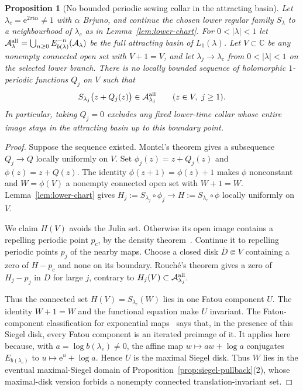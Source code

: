 \documentclass[11pt,a4paper]{article}
\newtheorem{proposition}[theorem]{Proposition}
\theoremstyle{definition}
\newcommand{\eee}{\mathrm{e}}
\newcommand{\ii}{\mathrm{i}}
\begin{document}
\begin{proposition}[No bounded periodic sewing collar in the attracting basin]
\label{prop:no-basin-collar}
Let $\lambda_c=\eee^{2\pi\ii\alpha}\ne1$ with $\alpha$ Brjuno, and
continue the chosen lower regular family $S_\lambda$ to a
neighbourhood of $\lambda_c$ as in Lemma~\ref{lem:lower-chart}.
For $0<|\lambda|<1$ let
$\mathcal A_\lambda^{\rm all}
 =\bigcup_{n\ge0}E_{b(\lambda)}^{-n}(\mathcal A_\lambda)$
be the full attracting basin of $L_1(\lambda)$.
Let $V\subset\mathbb C$ be any nonempty connected open set with
$V+1=V$, and let $\lambda_j\to\lambda_c$ from $0<|\lambda|<1$
on the selected lower branch.  There is no locally bounded sequence
of holomorphic $1$-periodic functions $Q_j$ on $V$ such that
\[
 S_{\lambda_j}\bigl(z+Q_j(z)\bigr)
       \in\mathcal A_{\lambda_j}^{\rm all}
 \qquad(z\in V,\ j\ge1).
\]
In particular, taking $Q_j=0$ excludes any fixed lower-time collar
whose entire image stays in the attracting basin up to this boundary
point.
\end{proposition}

\begin{proof}
Suppose the sequence existed.  Montel's theorem gives a subsequence
$Q_j\to Q$ locally uniformly on $V$.  Set
$\phi_j(z)=z+Q_j(z)$ and $\phi(z)=z+Q(z)$.
The identity $\phi(z+1)=\phi(z)+1$ makes $\phi$ nonconstant and
$W=\phi(V)$ a nonempty connected open set with $W+1=W$.
Lemma~\ref{lem:lower-chart} gives
$H_j:=S_{\lambda_j}\circ\phi_j\to
 H:=S_{\lambda_c}\circ\phi$ locally uniformly on $V$.

We claim $H(V)$ avoids the Julia set.  Otherwise its open image
contains a repelling periodic point $p_c$, by the density
theorem~\cite[Thm.~4]{Bergweiler1993}.  Continue it to repelling periodic
points $p_j$ of the nearby maps.  Choose a closed disk
$\overline D\Subset V$ containing a zero of $H-p_c$ and none on its
boundary.  Rouch\'e's theorem gives a zero of $H_j-p_j$ in $D$ for
large $j$, contrary to
$H_j(V)\subset\mathcal A_{\lambda_j}^{\rm all}$.

Thus the connected set $H(V)=S_{\lambda_c}(W)$ lies in one Fatou
component $U$.  The identity $W+1=W$ and the functional equation
make $U$ invariant.  The Fatou-component classification for
exponential maps~\cite[\S1, Remarks on notation]{Rempe2006Topological}
says that, in the presence of this Siegel disk, every Fatou component
is an iterated preimage of it.  It applies here because, with
$a=\log b(\lambda_c)\ne0$, the affine map
$w\mapsto aw+\log a$ conjugates $E_{b(\lambda_c)}$ to
$u\mapsto\eee^u+\log a$.  Hence $U$ is the maximal Siegel disk.
Thus $W$ lies in the eventual maximal-Siegel domain of
Proposition~\ref{prop:siegel-pullback}(2), whose maximal-disk version
forbids a nonempty connected translation-invariant set.
\end{proof}
\end{document}

